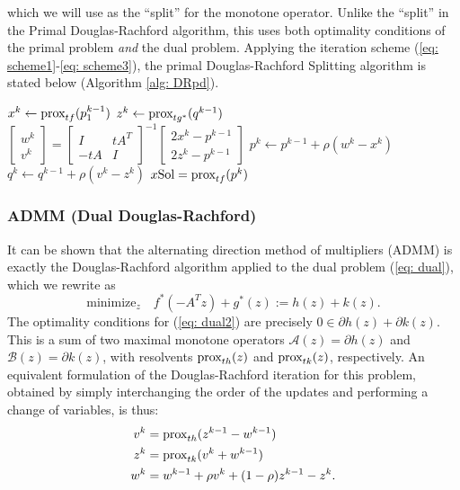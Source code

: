 \documentclass[12pt]{article}
\begin{document}
which we will use as the ``split'' for the monotone operator. Unlike the ``split'' in the Primal Douglas-Rachford algorithm, this
uses both optimality conditions of the primal problem \textit{and} the
dual problem.  Applying the iteration
scheme (\ref{eq: scheme1}-\ref{eq: scheme3}), the primal Douglas-Rachford Splitting
algorithm is stated below (Algorithm \ref{alg: DRpd}).

\begin{algorithm}[h!]

 {
  $x^k \leftarrow \text{prox}_{tf}(p^{k-1}_1)$  
  $z^k \leftarrow \text{prox}_{tg^*}(q^{k-1})$ \;
  $\begin{bmatrix} w^k\\ v^k  \end{bmatrix} = \begin{bmatrix} I &
   t A^T\\ -t A & I \end{bmatrix}^{-1} \begin{bmatrix}
    2x^k-p^{k-1}\\ 2z^k-p^{k-1} \end{bmatrix} $  
  $p^k \leftarrow p^{k-1} + \rho(w^k-x^k)$ \;
  $q^k \leftarrow q^{k-1} + \rho(v^k-z^k)$ \;
} 
\Return $x\text{Sol} = \text{prox}_{tf}(p^k)$\;
\caption{Primal-Dual Douglas-Rachford Splitting}\label{alg: DRpd} 
\end{algorithm}

\subsubsection{ADMM (Dual Douglas-Rachford)}  \label{sssec: ADMM}
It can be shown that the alternating direction method of multipliers (ADMM) is exactly the Douglas-Rachford algorithm applied to the dual problem (\ref{eq: dual}), which we rewrite as
\begin{equation}
\text{minimize}_z \quad f^*(-A^Tz) + g^*(z)  := h(z) + k(z). \label{eq: dual2}
\end{equation}
The optimality conditions for (\ref{eq: dual2}) are precisely $0 \in \partial h(z) + \partial k(z).$ This is a sum of two maximal monotone operators $\mathcal{A}(z) = \partial h(z) $ and $\mathcal{B}(z) = \partial k(z)$, with resolvents $\text{prox}_{th}(z)$ and $\text{prox}_{tk}(z)$, respectively. An equivalent formulation of the Douglas-Rachford iteration for this problem, obtained by simply interchanging the order of the updates and performing a change of variables, is thus:
\begin{align}
v^k &= \text{prox}_{th} (z^{k-1} - w^{k-1})\\
z^k &= \text{prox}_{tk} (v^k + w^{k-1} ) \\
w^k &= w^{k-1}+ \rho v^k + (1-\rho)z^{k-1} - z^k.
\end{align}
\end{document}
